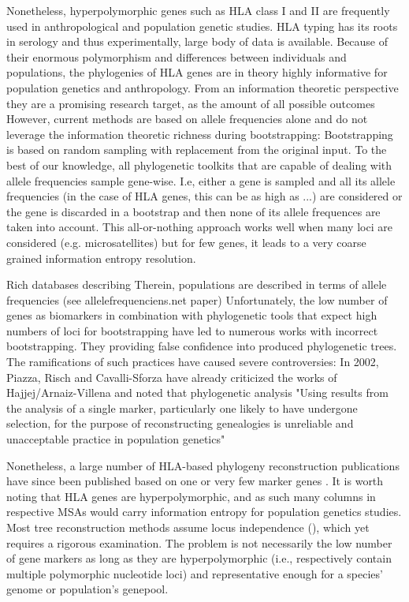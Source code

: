 \documentclass{article}
\begin{document}
Nonetheless, hyperpolymorphic genes such as HLA class I and II are frequently used in anthropological and population genetic studies.
HLA typing has its roots in serology and thus experimentally, large body of data is available.
Because of their enormous polymorphism and differences between individuals and populations, the phylogenies of HLA genes
are in theory highly informative for population genetics and anthropology. From an information theoretic perspective
they are a promising research target, as the amount of all possible outcomes
However, current methods are based on allele frequencies alone and do not leverage the information theoretic richness during bootstrapping:
Bootstrapping is based on random sampling with replacement from the original input. To the best of our knowledge,
all phylogenetic toolkits that are capable of dealing with allele frequencies sample gene-wise.
I.e, either a gene is sampled and all its allele frequencies (in the case of HLA genes, this can be as high as ...)
are considered or the gene is discarded in a bootstrap and then none of its allele frequences are taken into
account. This all-or-nothing approach works well when many loci are considered (e.g. microsatellites)
but for few genes, it leads to a very coarse grained information entropy resolution.

Rich databases describing
Therein, populations are described in terms of allele frequencies (see allelefrequenciens.net paper)
Unfortunately, the low number of genes as biomarkers in combination with phylogenetic tools that expect high numbers of
loci for bootstrapping have led to numerous works with incorrect bootstrapping.
They providing false confidence into produced phylogenetic trees. The ramifications of such practices have caused
severe controversies:
In 2002, Piazza, Risch and Cavalli-Sforza \cite{Risch2002Jan} have already criticized the works of Hajjej/Arnaiz-Villena and noted that
phylogenetic analysis  "Using results from the analysis of a single marker, particularly one likely to
have undergone selection, for the purpose of reconstructing genealogies is unreliable and unacceptable
practice in population genetics"

Nonetheless, a large number of HLA-based phylogeny reconstruction publications have since been  published based on one
or very few marker genes \cite{Hajjej2018Mar,arnaiz2001hla,ArnaizVillena2017Jan,Zhang2012Jun}.
It is worth noting that HLA genes are hyperpolymorphic, and as such many columns in respective MSAs would carry
information entropy for population genetics studies. Most tree reconstruction methods assume locus independence
(\cite{Efron1996Nov}), which yet requires a rigorous examination. The problem is not necessarily the low number of
gene markers as long as they are hyperpolymorphic (i.e., respectively contain multiple polymorphic nucleotide loci) and representative enough for a species' genome or population's genepool.
\end{document}
